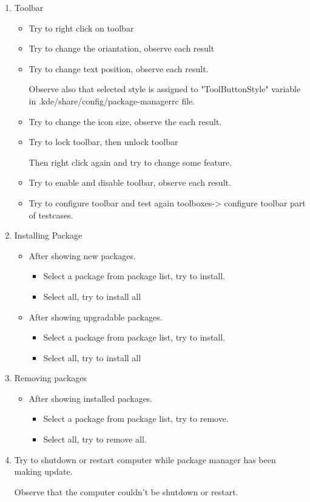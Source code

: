 \documentclass[a4paper,10pt]{article}
\begin{document}
\begin{enumerate}
    \item Toolbar
    \begin{itemize}
        \item Try to right click on toolbar
        \item Try to change the oriantation, observe each result
        \item Try to change text position, observe each result.
    
            Observe also that selected style is assigned to "ToolButtonStyle" variable in .kde/share/config/package-managerrc file.
        \item Try to change the icon size, observe the each result.
        \item Try to lock toolbar, then unlock toolbar
    
            Then right click again and try to change some feature.
        \item Try to enable and disable toolbar, observe each result.
        \item Try to configure toolbar and test again toolboxes-> configure toolbar part of testcases.
    \end{itemize}
    \item Installing Package
        \begin{itemize}
            \item After showing new packages. 
            \begin{itemize}
                \item Select a package from package list, try to install.
                \item Select all, try to install all
            \end{itemize}
            \item After showing upgradable packages.
            \begin{itemize}
                \item Select a package from package list, try to install.
                \item Select all, try to install all
            \end{itemize}
        \end{itemize}
    \item Removing packages
        \begin{itemize}
            \item After showing installed packages.
            \begin{itemize}
                \item Select a package from package list, try to remove.
                \item Select all, try to remove all.
            \end{itemize}
        \end{itemize}

        \item Try to shutdown or restart computer while package manager has been making update.

        Observe that the computer couldn't be shutdown or restart.
    \end{enumerate}
\end{document}
